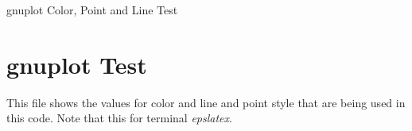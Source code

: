 \documentclass{article}
\begin{document}
\begin{center}
    \huge{gnuplot Color, Point and Line Test}
    \vspace{10mm}
\end{center}

\section{gnuplot Test}

    This file shows the values for color and line and point style that are being used in this code. Note that this for terminal \textit{epslatex}. 

\vspace{\fill}
\begin{figure*}[h]
	\centering
	\scalebox{0.85}{}
	\caption{\label{fig:test} Use this for setting the color in \LaTeX.}
\end{figure*}
\vspace{\fill}
\end{document}
